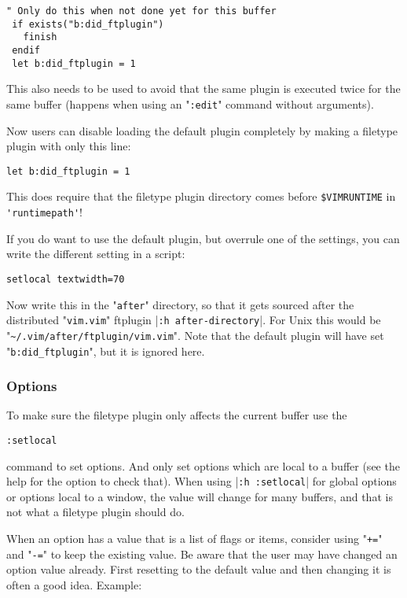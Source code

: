 \begin{Verbatim}[samepage=true]
 " Only do this when not done yet for this buffer
 if exists("b:did_ftplugin")
   finish
 endif
 let b:did_ftplugin = 1
\end{Verbatim}

This also needs to be used to avoid that the same plugin is executed twice for the same buffer (happens when using an "\verb!:edit!" command without arguments).

Now users can disable loading the default plugin completely by making a filetype plugin with only this line:

\begin{Verbatim}[samepage=true]
 let b:did_ftplugin = 1
\end{Verbatim}

This does require that the filetype plugin directory comes before \verb!$VIMRUNTIME! in \verb!'runtimepath'!!

If you do want to use the default plugin, but overrule one of the settings, you can write the different setting in a script:

\begin{Verbatim}[samepage=true]
 setlocal textwidth=70
\end{Verbatim}

Now write this in the "\verb!after!" directory, so that it gets sourced after the distributed "\verb!vim.vim!" ftplugin |\verb!:h after-directory!|.
For Unix this would be "\verb!~/.vim/after/ftplugin/vim.vim!".
Note that the default plugin will have set "\verb!b:did_ftplugin!", but it is ignored here.

\subsubsection{Options}
To make sure the filetype plugin only affects the current buffer use the

\begin{Verbatim}[samepage=true]
 :setlocal
\end{Verbatim}

command to set options.
And only set options which are local to a buffer (see the help for the option to check that).
When using |\verb!:h :setlocal!| for global options or options local to a window, the value will change for many buffers, and that is not what a filetype plugin should do.

When an option has a value that is a list of flags or items, consider using "\verb!+=!" and "\verb!-=!" to keep the existing value.
Be aware that the user may have changed an option value already.
First resetting to the default value and then changing it is often a good idea.
Example:

